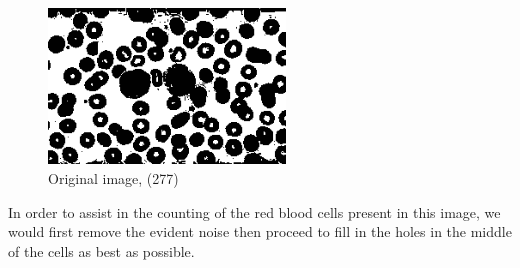 \documentclass{article}
\begin{document}
\begin{figure}[ht!]
    \centering
    \includegraphics[width=6.3cm]{redblood.png}
    \caption{Original image, (277)}
    \label{fig:erosionSym}
\end{figure}

\begin{flushleft}
In order to assist in the counting of the red blood cells present in this image, we would first remove the evident noise then proceed to fill in the holes in the middle of the cells as best as possible. 
\end{flushleft}
\end{document}

